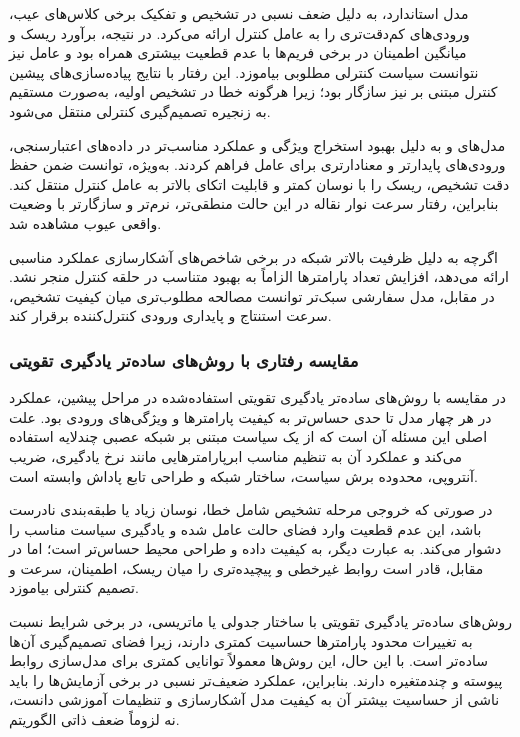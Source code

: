 \documentclass[a4paper, 10pt, twocolumn]{article}
\begin{document}
	مدل  استاندارد، به دلیل ضعف نسبی در تشخیص و تفکیک برخی کلاس‌های عیب، ورودی‌های کم‌دقت‌تری را به عامل کنترل ارائه می‌کرد. در نتیجه، برآورد ریسک و میانگین اطمینان در برخی فریم‌ها با عدم قطعیت بیشتری همراه بود و عامل  نیز نتوانست سیاست کنترلی مطلوبی بیاموزد. این رفتار با نتایج پیاده‌سازی‌های پیشین کنترل مبتنی بر  نیز سازگار بود؛ زیرا هرگونه خطا در تشخیص اولیه، به‌صورت مستقیم به زنجیره تصمیم‌گیری کنترلی منتقل می‌شود.
	
	مدل‌های  و  به دلیل بهبود استخراج ویژگی و عملکرد مناسب‌تر در داده‌های اعتبارسنجی، ورودی‌های پایدارتر و معنادارتری برای عامل فراهم کردند. به‌ویژه،  توانست ضمن حفظ دقت تشخیص، ریسک را با نوسان کمتر و قابلیت اتکای بالاتر به عامل کنترل منتقل کند. بنابراین، رفتار سرعت نوار نقاله در این حالت منطقی‌تر، نرم‌تر و سازگارتر با وضعیت واقعی عیوب مشاهده شد.
	
	اگرچه  به دلیل ظرفیت بالاتر شبکه در برخی شاخص‌های آشکارسازی عملکرد مناسبی ارائه می‌دهد، افزایش تعداد پارامترها الزاماً به بهبود متناسب در حلقه کنترل منجر نشد. در مقابل، مدل‌ سفارشی سبک‌تر توانست مصالحه مطلوب‌تری میان کیفیت تشخیص، سرعت استنتاج و پایداری ورودی کنترل‌کننده برقرار کند.
	
	\subsubsection*{مقایسه رفتاری  با روش‌های ساده‌تر یادگیری تقویتی}
	
	در مقایسه با روش‌های ساده‌تر یادگیری تقویتی استفاده‌شده در مراحل پیشین، عملکرد  در هر چهار مدل تا حدی حساس‌تر به کیفیت پارامترها و ویژگی‌های ورودی بود. علت اصلی این مسئله آن است که  از یک سیاست مبتنی بر شبکه عصبی چندلایه استفاده می‌کند و عملکرد آن به تنظیم مناسب ابرپارامترهایی مانند نرخ یادگیری، ضریب آنتروپی، محدوده برش سیاست، ساختار شبکه و طراحی تابع پاداش وابسته است.
	
	در صورتی که خروجی مرحله تشخیص شامل خطا، نوسان زیاد یا طبقه‌بندی نادرست باشد، این عدم قطعیت وارد فضای حالت عامل شده و یادگیری سیاست مناسب را دشوار می‌کند. به عبارت دیگر،  به کیفیت داده و طراحی محیط حساس‌تر است؛ اما در مقابل، قادر است روابط غیرخطی و پیچیده‌تری را میان ریسک، اطمینان، سرعت و تصمیم کنترلی بیاموزد.
	
	روش‌های ساده‌تر یادگیری تقویتی با ساختار جدولی یا ماتریسی، در برخی شرایط نسبت به تغییرات محدود پارامترها حساسیت کمتری دارند، زیرا فضای تصمیم‌گیری آن‌ها ساده‌تر است. با این حال، این روش‌ها معمولاً توانایی کمتری برای مدل‌سازی روابط پیوسته و چندمتغیره دارند. بنابراین، عملکرد ضعیف‌تر نسبی  در برخی آزمایش‌ها را باید ناشی از حساسیت بیشتر آن به کیفیت مدل آشکارسازی و تنظیمات آموزشی دانست، نه لزوماً ضعف ذاتی الگوریتم.
	
\end{document}
